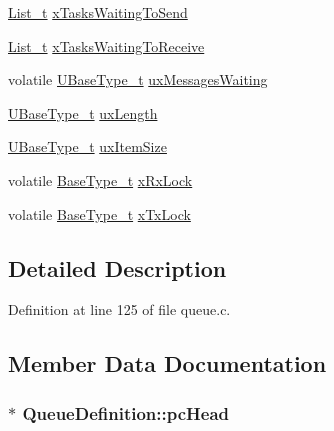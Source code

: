 \begin{DoxyCompactItemize}
\begin{tabbing}
\end{tabbing}\item 
\hyperlink{list_8h_afd590ef6400071b4d63d65ef90bea7f4}{List\+\_\+t} \hyperlink{struct_queue_definition_aaab135c4345cb0393d6ff3cd5164c7b2}{x\+Tasks\+Waiting\+To\+Send}
\item 
\hyperlink{list_8h_afd590ef6400071b4d63d65ef90bea7f4}{List\+\_\+t} \hyperlink{struct_queue_definition_af6d61526f77beee659cd604a0c473359}{x\+Tasks\+Waiting\+To\+Receive}
\item 
volatile \hyperlink{_g_c_c_2_a_r_m___c_m3_2portmacro_8h_a646f89d4298e4f5afd522202b11cb2e6}{U\+Base\+Type\+\_\+t} \hyperlink{struct_queue_definition_a12b07a40152d0f21488ca06d362d13d1}{ux\+Messages\+Waiting}
\item 
\hyperlink{_g_c_c_2_a_r_m___c_m3_2portmacro_8h_a646f89d4298e4f5afd522202b11cb2e6}{U\+Base\+Type\+\_\+t} \hyperlink{struct_queue_definition_ae80d17a812c669d4d41265b7f693988c}{ux\+Length}
\item 
\hyperlink{_g_c_c_2_a_r_m___c_m3_2portmacro_8h_a646f89d4298e4f5afd522202b11cb2e6}{U\+Base\+Type\+\_\+t} \hyperlink{struct_queue_definition_a81bb7d3826909244baa9debf5a55abb0}{ux\+Item\+Size}
\item 
volatile \hyperlink{_g_c_c_2_a_r_m___c_m3_2portmacro_8h_a46fb21e00ae0729d7515c0fbf2269796}{Base\+Type\+\_\+t} \hyperlink{struct_queue_definition_acfda1aacb3043fab24087782f996dc8b}{x\+Rx\+Lock}
\item 
volatile \hyperlink{_g_c_c_2_a_r_m___c_m3_2portmacro_8h_a46fb21e00ae0729d7515c0fbf2269796}{Base\+Type\+\_\+t} \hyperlink{struct_queue_definition_a96013417532d70900fb608f5926d8043}{x\+Tx\+Lock}
\end{DoxyCompactItemize}


\subsection{Detailed Description}


Definition at line 125 of file queue.\+c.



\subsection{Member Data Documentation}
\subsubsection[{\texorpdfstring{pc\+Head}{pcHead}}]{$\ast$ Queue\+Definition\+::pc\+Head}\hypertarget{struct_queue_definition_a487dc7e43b380c58212cba72bc33e0ed}{}\label{struct_queue_definition_a487dc7e43b380c58212cba72bc33e0ed}


